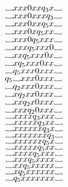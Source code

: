 \documentclass[12pt]{article}
\newcommand\Vtextvisiblespace[1][.8em]{%
	\mbox{\kern.07em\vrule height.3ex}%
	\vbox{\hrule width#1}%
	\hbox{\vrule height.3ex}}
\begin{document}
$\Vtextvisiblespace xxx0xx    q_3 x       \Vtextvisiblespace  $  \\
$\Vtextvisiblespace xxx0xxx   q_3         \Vtextvisiblespace  $  \\
$\Vtextvisiblespace xxx0xx    q_5 x       \Vtextvisiblespace  $  \\
$\Vtextvisiblespace xxx0x     q_5 xx      \Vtextvisiblespace  $  \\
$\Vtextvisiblespace xxx0      q_5 xxx     \Vtextvisiblespace  $  \\
$\Vtextvisiblespace xxx       q_5 xxx0    \Vtextvisiblespace  $  \\
$\Vtextvisiblespace xx        q_5 xxx0x   \Vtextvisiblespace  $  \\
$\Vtextvisiblespace x         q_5 xxx0xx  \Vtextvisiblespace  $  \\
$\Vtextvisiblespace           q_5 xxx0xxx \Vtextvisiblespace  $  \\
$q_5 \Vtextvisiblespace           xxx0xxx \Vtextvisiblespace  $  \\
$\Vtextvisiblespace           q_2 xxx0xxx \Vtextvisiblespace  $  \\
$\Vtextvisiblespace x         q_2 xx0xxx  \Vtextvisiblespace  $  \\
$\Vtextvisiblespace xx        q_2 x0xxx   \Vtextvisiblespace  $  \\
$\Vtextvisiblespace xxx       q_2 0xxx    \Vtextvisiblespace  $  \\
$\Vtextvisiblespace xxxx      q_3 xxx     \Vtextvisiblespace  $  \\
$\Vtextvisiblespace xxxxx     q_3 xx      \Vtextvisiblespace  $  \\
$\Vtextvisiblespace xxxxxx    q_3 x       \Vtextvisiblespace  $  \\
$\Vtextvisiblespace xxxxxxx   q_3         \Vtextvisiblespace  $  \\
$\Vtextvisiblespace xxxxxx    q_5 x       \Vtextvisiblespace  $  \\
$\Vtextvisiblespace xxxxx     q_5 xx      \Vtextvisiblespace  $  \\
$\Vtextvisiblespace xxxx      q_5 xxx     \Vtextvisiblespace  $  \\
$\Vtextvisiblespace xxx       q_5 xxxx    \Vtextvisiblespace  $  \\
$\Vtextvisiblespace xx        q_5 xxxxx   \Vtextvisiblespace  $  \\
$\Vtextvisiblespace x         q_5 xxxxxx  \Vtextvisiblespace  $  \\
$\Vtextvisiblespace           q_5 xxxxxxx \Vtextvisiblespace  $  \\
\end{document}
